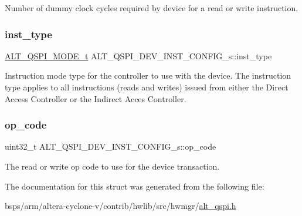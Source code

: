 Number of dummy clock cycles required by device for a read or write instruction. \mbox{\label{structALT__QSPI__DEV__INST__CONFIG__s_a168705d7df15506a68e330b6cfda75f1}} 
\subsubsection{\texorpdfstring{inst\_type}{inst\_type}}
{\footnotesize\ttfamily \mbox{\hyperlink{group__ALT__QSPI__DEV__CFG_ga4d03e307842e1ed33be0039a56ef62c3}{A\+L\+T\+\_\+\+Q\+S\+P\+I\+\_\+\+M\+O\+D\+E\+\_\+t}} A\+L\+T\+\_\+\+Q\+S\+P\+I\+\_\+\+D\+E\+V\+\_\+\+I\+N\+S\+T\+\_\+\+C\+O\+N\+F\+I\+G\+\_\+s\+::inst\+\_\+type}

Instruction mode type for the controller to use with the device. The instruction type applies to all instructions (reads and writes) issued from either the Direct Access Controller or the Indirect Acces Controller. \mbox{\label{structALT__QSPI__DEV__INST__CONFIG__s_add4e3c320b8d5256bce1eb87e794f8a8}} 
\subsubsection{\texorpdfstring{op\_code}{op\_code}}
{\footnotesize\ttfamily uint32\+\_\+t A\+L\+T\+\_\+\+Q\+S\+P\+I\+\_\+\+D\+E\+V\+\_\+\+I\+N\+S\+T\+\_\+\+C\+O\+N\+F\+I\+G\+\_\+s\+::op\+\_\+code}

The read or write op code to use for the device transaction. 

The documentation for this struct was generated from the following file\+:\begin{DoxyCompactItemize}
\item 
bsps/arm/altera-\/cyclone-\/v/contrib/hwlib/src/hwmgr/\mbox{\hyperlink{contrib_2hwlib_2src_2hwmgr_2alt__qspi_8h}{alt\+\_\+qspi.\+h}}\end{DoxyCompactItemize}
